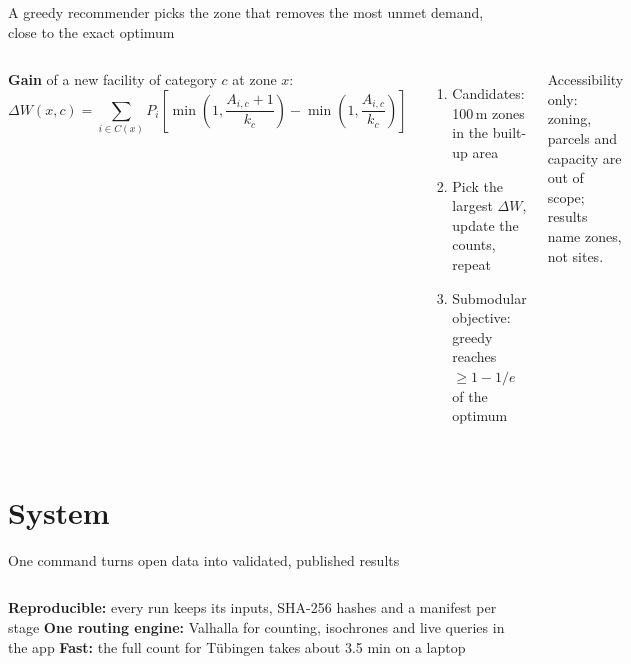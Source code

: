 \documentclass[aspectratio=169,10pt]{beamer}
\begin{document}
\begin{frame}{A greedy recommender picks the zone that removes the most unmet demand, close to
  the exact optimum}
  \begin{columns}[T,onlytextwidth]
      \textbf{Gain} of a new facility of category $c$ at zone $x$:
      \[ \Delta W(x,c) = \sum_{i \in C(x)} P_i \left[\min\left(1,\frac{A_{i,c}+1}{k_c}\right) -
         \min\left(1,\frac{A_{i,c}}{k_c}\right)\right] \]\vspace{-2mm}
      \begin{enumerate}\small
        \item Candidates: 100\,m zones in the built-up area
        \item Pick the largest $\Delta W$, update the counts, repeat
        \item Submodular objective: greedy reaches $\ge 1 - 1/e$ of the optimum
      \end{enumerate}
      \par\bigskip
      \par\bigskip
      {\scriptsize\color{muted} Accessibility only: zoning, parcels and capacity are out of
      scope; results name zones, not sites.}
  \end{columns}
\end{frame}

\section{System}

\begin{frame}{One command turns open data into validated, published results}
  \vspace{4mm}
  \centering\pipelinefigure\par
  \vspace{6mm}
  \begin{columns}[T,onlytextwidth]
    \footnotesize\textbf{Reproducible:} every run keeps its inputs,
      SHA-256 hashes and a manifest per stage
    \footnotesize\textbf{One routing engine:} Valhalla for counting,
      isochrones and live queries in the app
    \footnotesize\textbf{Fast:} the full count for Tübingen takes
      about 3.5 min on a laptop
  \end{columns}
\end{frame}
\end{document}
